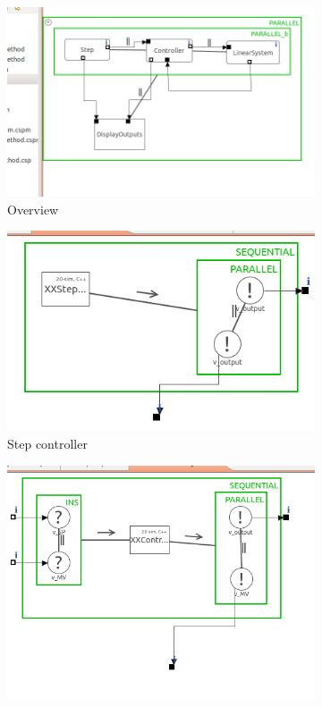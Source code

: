 \documentclass[a4paper,twoside,11pt]{article}
\begin{document}
\begin{figure}
	\centering
	\begin{subfigure}{0.6\textwidth}
	 \centering
	 \includegraphics[width=\textwidth]{./images/3-2_overview.png}
	 \caption{Overview}
	 \label{fig:3_2_overview}
	\end{subfigure}%
	\begin{subfigure}{0.6\textwidth}
	 \centering
	 \includegraphics[width=\textwidth]{./images/3-2_step.png}
	 \caption{Step controller}
	 \label{fig:3_2_step}
	\end{subfigure}
	\begin{subfigure}{0.6\textwidth}
	 \centering
	 \includegraphics[width=\textwidth]{./images/3-2_controller.png}

\end{subfigure}
\end{figure}
\end{document}
